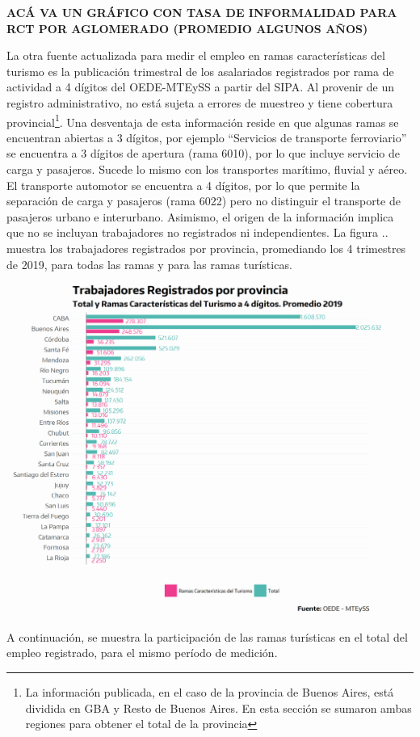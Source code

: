 \documentclass[
  openany]{book}
\begin{document}
\textbf{ACÁ VA UN GRÁFICO CON TASA DE INFORMALIDAD PARA RCT POR AGLOMERADO (PROMEDIO ALGUNOS AÑOS)}

La otra fuente actualizada para medir el empleo en ramas características del turismo es la publicación trimestral de los asalariados registrados por rama de actividad a 4 dígitos del OEDE-MTEySS a partir del SIPA. Al provenir de un registro administrativo, no está sujeta a errores de muestreo y tiene cobertura provincial\footnote{La información publicada, en el caso de la provincia de Buenos Aires, está dividida en GBA y Resto de Buenos Aires. En esta sección se sumaron ambas regiones para obtener el total de la provincia}. Una desventaja de esta información reside en que algunas ramas se encuentran abiertas a 3 dígitos, por ejemplo ``Servicios de transporte ferroviario'' se encuentra a 3 dígitos de apertura (rama 6010), por lo que incluye servicio de carga y pasajeros. Sucede lo mismo con los transportes marítimo, fluvial y aéreo. El transporte automotor se encuentra a 4 dígitos, por lo que permite la separación de carga y pasajeros (rama 6022) pero no distinguir el transporte de pasajeros urbano e interurbano.
Asimismo, el origen de la información implica que no se incluyan trabajadores no registrados ni independientes. La figura .. muestra los trabajadores registrados por provincia, promediando los 4 trimestres de 2019, para todas las ramas y para las ramas turísticas.

\begin{center}\includegraphics[width=0.8\linewidth]{imagenes/empleo.prov} \end{center}

A continuación, se muestra la participación de las ramas turísticas en el total del empleo registrado, para el mismo período de medición.
\end{document}
